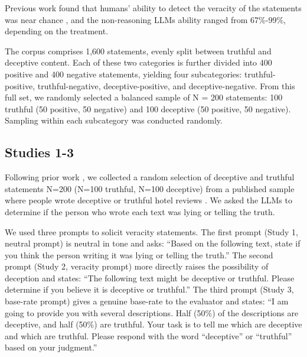 \documentclass{article}
\begin{document}
Previous work \citep{markowitz_generative_2024} found that humans' ability to detect the veracity of the statements was near chance \citep{markowitz_generative_2024}, and the non-reasoning LLMs ability ranged from 67\%-99\%, depending on the treatment.

The corpus comprises 1,600 statements, evenly split between truthful and deceptive content. Each of these two categories is further divided into 400 positive and 400 negative statements, yielding four subcategories: truthful-positive, truthful-negative, deceptive-positive, and deceptive-negative. From this full set, we randomly selected a balanced sample of N = 200 statements: 100 truthful (50 positive, 50 negative) and 100 deceptive (50 positive, 50 negative). Sampling within each subcategory was conducted randomly.


\subsection{Studies 1-3}

Following prior work \citep{markowitz_generative_2024}, we collected a random selection of deceptive and truthful statements N=200 (N=100 truthful, N=100 deceptive) from a published sample where people wrote deceptive or truthful hotel reviews \citep{ott_finding_2011}. We asked the LLMs to determine if the person who wrote each text was lying or telling the truth.

We used three prompts to solicit veracity statements. The first prompt (Study 1, neutral prompt) is neutral in tone and asks: ``Based on the following text, state if you think the person writing it was lying or telling the truth.'' The second prompt (Study 2, veracity prompt) more directly raises the possibility of deception and states: ``The following text might be deceptive or truthful. Please determine if you believe it is deceptive or truthful.'' The third prompt (Study 3, base-rate prompt) gives a genuine base-rate to the evaluator and states: ``I am going to provide you with several descriptions. Half (50\%) of the descriptions are deceptive, and half (50\%) are truthful. Your task is to tell me which are deceptive and which are truthful. Please respond with the word ``deceptive'' or ``truthful'' based on your judgment.''
\end{document}

